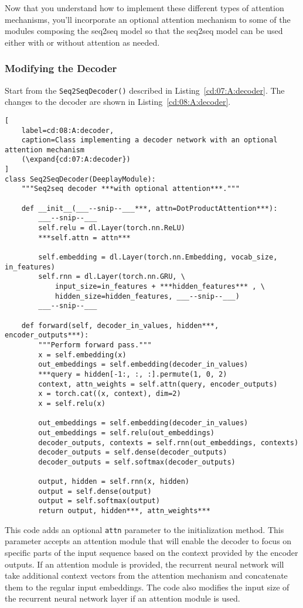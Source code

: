 Now that you understand how to implement these  different types of attention mechanisms, you'll incorporate an optional attention mechanism to some of the modules composing the seq2seq model so that the seq2seq model can be used either with or without attention as needed.

\subsubsection{Modifying the Decoder}

Start from the \lstinline{Seq2SeqDecoder()} described in Listing~\ref{cd:07:A:decoder}. The changes to the decoder are shown in Listing~\ref{cd:08:A:decoder}.

\begin{lstlisting}[
    label=cd:08:A:decoder,
    caption=Class implementing a decoder network with an optional attention mechanism
    (\expand{cd:07:A:decoder})
]
class Seq2SeqDecoder(DeeplayModule):
    """Seq2seq decoder ***with optional attention***."""

    def __init__(___--snip--___***, attn=DotProductAttention***):
        ___--snip--___
        self.relu = dl.Layer(torch.nn.ReLU)
        ***self.attn = attn***
        
        self.embedding = dl.Layer(torch.nn.Embedding, vocab_size, in_features)
        self.rnn = dl.Layer(torch.nn.GRU, \
            input_size=in_features + ***hidden_features*** , \
            hidden_size=hidden_features, ___--snip--___)
        ___--snip--___

    def forward(self, decoder_in_values, hidden***, encoder_outputs***):
        """Perform forward pass."""
        x = self.embedding(x)
        out_embeddings = self.embedding(decoder_in_values)
        ***query = hidden[-1:, :, :].permute(1, 0, 2)
        context, attn_weights = self.attn(query, encoder_outputs)
        x = torch.cat((x, context), dim=2)
        x = self.relu(x)

        out_embeddings = self.embedding(decoder_in_values)
        out_embeddings = self.relu(out_embeddings)
        decoder_outputs, contexts = self.rnn(out_embeddings, contexts)
        decoder_outputs = self.dense(decoder_outputs)
        decoder_outputs = self.softmax(decoder_outputs)

        output, hidden = self.rnn(x, hidden)
        output = self.dense(output)
        output = self.softmax(output)
        return output, hidden***, attn_weights***
\end{lstlisting}
This code adds an optional \lstinline{attn} parameter to the initialization method. This parameter accepts an attention module that will enable the decoder to focus on specific parts of the input sequence based on the context provided by the encoder outputs. If an attention module is provided, the recurrent neural network will take additional context vectors from the attention mechanism and concatenate them to the regular input embeddings. The code also modifies the input size of the recurrent neural network layer if an attention module is used. 

